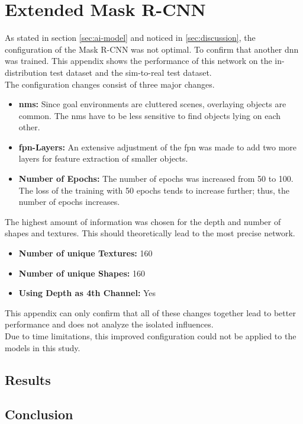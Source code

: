 \chapter{Extended Mask R-CNN}
\label{appendix:extended-mask-rcnn}

	As stated in section \ref{sec:ai-model} and noticed in \ref{sec:discussion}, the configuration of the Mask R-CNN was not optimal. To confirm that another \ac{dnn} was trained. This appendix shows the performance of this network on the in-distribution test dataset and the sim-to-real test dataset.\\
	The configuration changes consist of three major changes. 
	\begin{itemize}
		\item \textbf{\acl{nms}:} Since goal environments are cluttered scenes, overlaying objects are common. The \ac{nms} have to be less sensitive to find objects lying on each other. 
		\item \textbf{\acl{fpn}-Layers:} An extensive adjustment of the \ac{fpn} was made to add two more layers for feature extraction of smaller objects.
		\item \textbf{Number of Epochs:} The number of epochs was increased from 50 to 100. The loss of the training with 50 epochs tends to increase further; thus, the number of epochs increases.
	\end{itemize}
	The highest amount of information was chosen for the depth and number of shapes and textures. This should theoretically lead to the most precise network.
	\begin{itemize}
		\item \textbf{Number of unique Textures:} 160
		\item \textbf{Number of unique Shapes:} 160
		\item \textbf{Using Depth as 4th Channel:} Yes
	\end{itemize}
	This appendix can only confirm that all of these changes together lead to better performance and does not analyze the isolated influences.\\
	Due to time limitations, this improved configuration could not be applied to the models in this study.
	
	\section{Results}
	
	
	
	\section{Conclusion}
	
